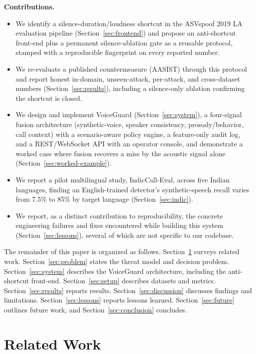 \documentclass[conference]{IEEEtran}
\begin{document}
\textbf{Contributions.}
\begin{itemize}
\item We identify a silence-duration/loudness shortcut in the ASVspoof
2019 LA evaluation pipeline (Section~\ref{sec:frontend}) and propose an
anti-shortcut front-end plus a permanent silence-ablation gate as a
reusable protocol, stamped with a reproducible fingerprint on every
reported number.
\item We re-evaluate a published countermeasure (AASIST) through this
protocol and report honest in-domain, unseen-attack, per-attack, and
cross-dataset numbers (Section~\ref{sec:results}), including a
silence-only ablation confirming the shortcut is closed.
\item We design and implement VoiceGuard (Section~\ref{sec:system}), a
four-signal fusion architecture (synthetic-voice, speaker consistency,
prosody/behavior, call context) with a scenario-aware policy engine, a
feature-only audit log, and a REST/WebSocket API with an operator
console, and demonstrate a worked case where fusion recovers a miss by
the acoustic signal alone (Section~\ref{sec:worked-example}).
\item We report a pilot multilingual study, IndicCall-Eval, across five
Indian languages, finding an English-trained detector's synthetic-speech
recall varies from 7.5\% to 85\% by target language
(Section~\ref{sec:indic}).
\item We report, as a distinct contribution to reproducibility, the
concrete engineering failures and fixes encountered while building this
system (Section~\ref{sec:lessons}), several of which are not specific
to our codebase.
\end{itemize}

The remainder of this paper is organized as follows.
Section~\ref{sec:related} surveys related work. Section~\ref{sec:problem}
states the threat model and decision problem. Section~\ref{sec:system}
describes the VoiceGuard architecture, including the anti-shortcut
front-end. Section~\ref{sec:setup} describes datasets and metrics.
Section~\ref{sec:results} reports results. Section~\ref{sec:discussion}
discusses findings and limitations. Section~\ref{sec:lessons} reports
lessons learned. Section~\ref{sec:future} outlines future work, and
Section~\ref{sec:conclusion} concludes.

\section{Related Work}
\label{sec:related}
\end{document}
